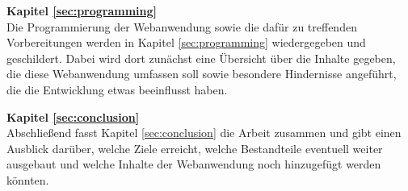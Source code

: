 \textbf{Kapitel \ref{sec:programming}} \\[0.2em]
Die Programmierung der Webanwendung sowie die dafür zu treffenden Vorbereitungen werden in Kapitel \ref{sec:programming} wiedergegeben und geschildert. Dabei wird dort zunächst eine Übersicht über die Inhalte gegeben, die diese Webanwendung umfassen soll sowie besondere Hindernisse angeführt, die die Entwicklung etwas beeinflusst haben.

\textbf{Kapitel \ref{sec:conclusion}} \\[0.2em]
Abschließend fasst Kapitel \ref{sec:conclusion} die Arbeit zusammen und gibt einen Ausblick darüber, welche Ziele erreicht, welche Bestandteile eventuell weiter ausgebaut und welche Inhalte der Webanwendung noch hinzugefügt werden könnten.